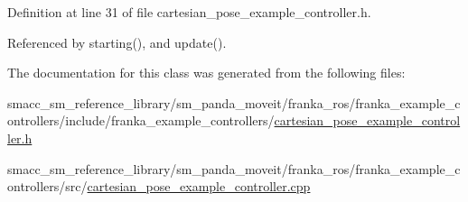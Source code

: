 Definition at line 31 of file cartesian\+\_\+pose\+\_\+example\+\_\+controller.\+h.



Referenced by starting(), and update().



The documentation for this class was generated from the following files\+:\begin{DoxyCompactItemize}
\item 
smacc\+\_\+sm\+\_\+reference\+\_\+library/sm\+\_\+panda\+\_\+moveit/franka\+\_\+ros/franka\+\_\+example\+\_\+controllers/include/franka\+\_\+example\+\_\+controllers/\hyperlink{cartesian__pose__example__controller_8h}{cartesian\+\_\+pose\+\_\+example\+\_\+controller.\+h}\item 
smacc\+\_\+sm\+\_\+reference\+\_\+library/sm\+\_\+panda\+\_\+moveit/franka\+\_\+ros/franka\+\_\+example\+\_\+controllers/src/\hyperlink{cartesian__pose__example__controller_8cpp}{cartesian\+\_\+pose\+\_\+example\+\_\+controller.\+cpp}\end{DoxyCompactItemize}
